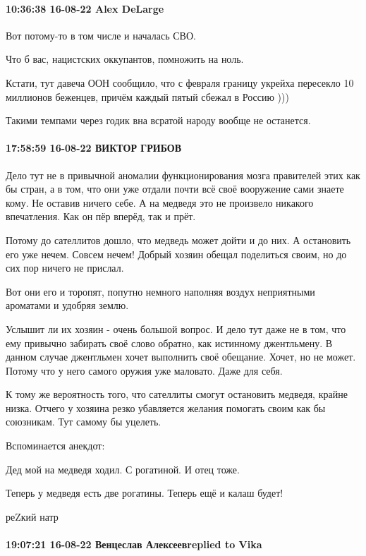 \paragraph{10:36:38 16-08-22 Alex DeLarge}

Вот потому-то в том числе и началась СВО.

Что б вас, нацистских оккупантов, помножить на ноль.

Кстати, тут давеча ООН сообщило, что с февраля границу укрейха пересекло 10
миллионов беженцев, причём каждый пятый сбежал в Россию )))

Такими темпами через годик вна всратой народу вообще не останется.

\paragraph{17:58:59 16-08-22 ВИКТОР ГРИБОВ}

Дело тут не в привычной аномалии функционирования мозга правителей этих как бы
стран, а в том, что они уже отдали почти всё своё вооружение сами знаете кому.
Не оставив ничего себе. А на медведя это не произвело никакого впечатления. Как
он пёр вперёд, так и прёт.

Потому до сателлитов дошло, что медведь может дойти и до них. А остановить его
уже нечем. Совсем нечем! Добрый хозяин обещал поделиться своим, но до сих пор
ничего не прислал.

Вот они его и торопят, попутно немного наполняя воздух неприятными ароматами и
удобряя землю.

Услышит ли их хозяин - очень большой вопрос. И дело тут даже не в том, что ему
привычно забирать своё слово обратно, как истинному джентльмену. В данном
случае джентльмен хочет выполнить своё обещание. Хочет, но не может. Потому что
у него самого оружия уже маловато. Даже для себя.

К тому же вероятность того, что сателлиты смогут остановить медведя, крайне
низка. Отчего у хозяина резко убавляется желания помогать своим как бы
союзникам. Тут самому бы уцелеть.

Вспоминается анекдот:

Дед мой на медведя ходил. С рогатиной. И отец тоже.

Теперь у медведя есть две рогатины. Теперь ещё и калаш будет!

реZкий натр

\paragraph{19:07:21 16-08-22 Венцеслав Алексеевreplied to Vika}

